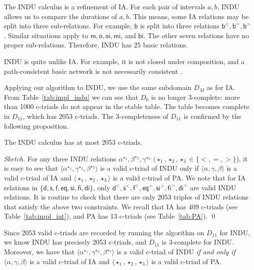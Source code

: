 \documentclass{llncs}
\newcommand{\sfp}{\textsf{b}}
\newcommand{\sfm}{\textsf{m}}
\newcommand{\sfo}{\textsf{o}}
\newcommand{\sfd}{\textsf{d}}
\newcommand{\sfs}{\textsf{s}}
\newcommand{\sff}{\textsf{f}}
\newcommand{\sfeq}{\textsf{eq}}
\newcommand{\sffi}{\textsf{fi}}
\newcommand{\sfsi}{\textsf{si}}
\newcommand{\sfoi}{\textsf{oi}}
\newcommand{\sfdi}{\textsf{di}}
\newcommand{\sfmi}{\textsf{mi}}
\newcommand{\sfpi}{\textsf{bi}}
\begin{document}
\begin{example}\label{ex:indu}
The INDU calculus \cite{PujariKS99} is a refinement of IA. For each pair of intervals $a,b$, INDU allows us to compare the durations of $a,b$. This means, some IA relations may be split into three sub-relations. For example, $\sfp$ is split into three relations $\sfp^<,\sfp^=,\sfp^>$. Similar situations apply to $\sfm, \sfo, \sfoi,\sfmi$, and $\sfpi$. The other seven relations have no proper sub-relations.  Therefore, INDU has 25 basic relations.
\end{example}

INDU is quite unlike IA. For example, it is not closed under composition, and a path-consistent basic network is not necessarily consistent \cite{BalbianiCL06}.

Applying our algorithm to INDU, we use the same subdomain $D_M$ as for IA. From Table~\ref{tab:impl_indu} we can see that $D_6$ is no longer 3-complete: more than 1000 c-triads do not appear in the stable table. The table becomes complete in $D_{11}$, which has 2053 c-triads. The 3-completeness of $D_{11}$ is confirmed by the following proposition. 
\begin{proposition}\label{prop:indu-2053}
The INDU calculus has at most 2053 c-triads.
\end{proposition}
\begin{proof}[Sketch]
For any three INDU relations $\alpha^{\star_1},\beta^{\star_2}, \gamma^{\star_3}$  $(\star_1,\star_2,\star_3\in\{<,=,>\}$), it is easy to see that $\langle \alpha^{\star_1},\gamma^{\star_2},\beta^{\star_3}\rangle$ is a valid c-triad of INDU only if $\langle \alpha,\gamma,\beta\rangle$ is a valid c-triad of IA and $\langle\star_1,\star_2,\star_3\rangle$ is a valid c-triad of PA. We note that for IA relations in $\{\sfd,\sfs,\sff,\sfeq,\sfsi,\sffi,\sfdi\}$, only $\sfd^<,\sfs^<,\sff^<,\sfeq^=,\sfsi^>,\sffi^>,\sfdi^>$ are valid INDU relations. It is routine to check that there are only 2053 triples of INDU relations that satisfy the above two constraints. We recall that IA has 409 c-triads (see Table~\ref{tab:impl_int}), and PA has 13 c-triads (see Table~\ref{tab:PA}).  \qed
\end{proof}
Since 2053 valid c-triads are recorded by running the algorithm on $D_{11}$ for INDU, we know INDU has precisely 2053 c-triads, and $D_{11}$ is 3-complete for INDU. Moreover, we have that $\langle \alpha^{\star_1},\gamma^{\star_2},\beta^{\star_3}\rangle$ is a valid c-triad of INDU \emph{if and only if} $\langle \alpha,\gamma,\beta\rangle$ is a valid c-triad of IA and $\langle\star_1,\star_2,\star_3\rangle$ is a valid c-triad of PA.  
\end{document}

